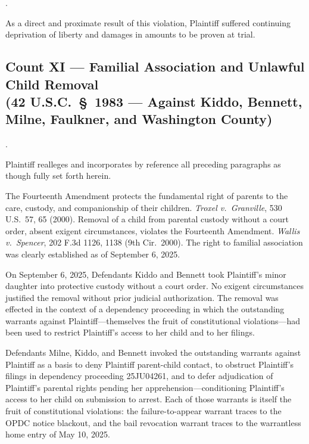 \documentclass[12pt,letterpaper]{article}
\newcounter{complaintpara}
\newenvironment{paras}{%
	\begin{list}{\arabic{complaintpara}.}{%
			\setlength{\leftmargin}{0.5in}%
			\setlength{\labelwidth}{0.4in}%
			\setlength{\labelsep}{0.1in}%
			\setlength{\itemsep}{0pt}%
			\setlength{\parsep}{0pt}%
			\setlength{\topsep}{6pt}%
		}%
	}{%
	\end{list}%
}
\begin{document}
\begin{paras}
		\item As a direct and proximate result of this violation,
		Plaintiff suffered continuing deprivation of liberty and
		damages in amounts to be proven at trial.
		
	\end{paras}
	\subsection*{Count XI --- Familial Association and Unlawful Child Removal\\
		(42 U.S.C.\ \S\ 1983 --- Against Kiddo, Bennett, Milne,
		Faulkner, and Washington County)}
	\begin{paras}
		
		\item Plaintiff realleges and incorporates by reference all
		preceding paragraphs as though fully set forth herein.
		
		\item The Fourteenth Amendment protects the fundamental right
		of parents to the care, custody, and companionship of their
		children. \textit{Troxel v.\ Granville}, 530 U.S.\ 57,
		65 (2000). Removal of a child from parental custody without
		a court order, absent exigent circumstances, violates the
		Fourteenth Amendment. \textit{Wallis v.\ Spencer},
		202 F.3d 1126, 1138 (9th Cir.\ 2000). The right to familial
		association was clearly established as of September 6, 2025.
		
		\item On September 6, 2025, Defendants Kiddo and Bennett took
		Plaintiff's minor daughter into protective custody without a
		court order. No exigent circumstances justified the removal
		without prior judicial authorization. The removal was
		effected in the context of a dependency proceeding in which
		the outstanding warrants against Plaintiff---themselves the
		fruit of constitutional violations---had been used to
		restrict Plaintiff's access to her child and to her filings.
		
		\item Defendants Milne, Kiddo, and Bennett invoked the
		outstanding warrants against Plaintiff as a basis to deny
		Plaintiff parent-child contact, to obstruct Plaintiff's
		filings in dependency proceeding 25JU04261, and to defer
		adjudication of Plaintiff's parental rights pending her
		apprehension---conditioning Plaintiff's access to her child
		on submission to arrest. Each of those warrants is itself
		the fruit of constitutional violations: the failure-to-appear
		warrant traces to the OPDC notice blackout, and the bail
		revocation warrant traces to the warrantless home entry of
		May 10, 2025.
		

\end{paras}
\end{document}
